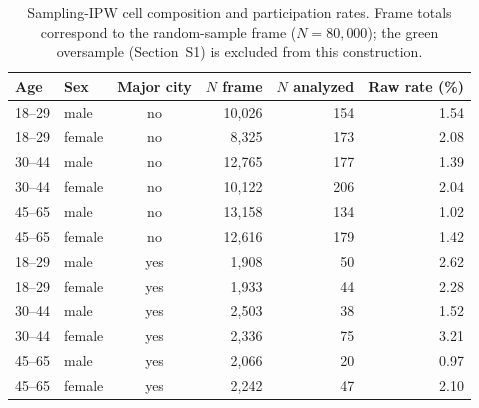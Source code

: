 \documentclass[12pt]{article}
\begin{document}
\begin{table}[!htbp]
\centering
\small
\caption{Sampling-IPW cell composition and participation rates. Frame totals correspond to the random-sample frame ($N=80{,}000$); the green oversample (Section~S1) is excluded from this construction.}
\label{tab:ipw_cells}
\begin{tabular}{llcrrr}
\toprule
\textbf{Age} & \textbf{Sex} & \textbf{Major city} & \textbf{$N$ frame} & \textbf{$N$ analyzed} & \textbf{Raw rate (\%)} \\
\midrule
18--29 & male   & no  & 10{,}026 & 154 & 1.54 \\
18--29 & female & no  & 8{,}325 & 173 & 2.08 \\
30--44 & male   & no  & 12{,}765 & 177 & 1.39 \\
30--44 & female & no  & 10{,}122 & 206 & 2.04 \\
45--65 & male   & no  & 13{,}158 & 134 & 1.02 \\
45--65 & female & no  & 12{,}616 & 179 & 1.42 \\
18--29 & male   & yes & 1{,}908 & 50 & 2.62 \\
18--29 & female & yes & 1{,}933 & 44 & 2.28 \\
30--44 & male   & yes & 2{,}503 & 38 & 1.52 \\
30--44 & female & yes & 2{,}336 & 75 & 3.21 \\
45--65 & male   & yes & 2{,}066 & 20 & 0.97 \\
45--65 & female & yes & 2{,}242 & 47 & 2.10 \\
\bottomrule
\end{tabular}
\end{table}
\end{document}
